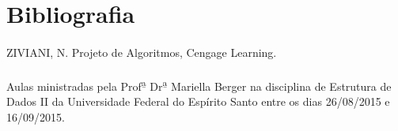 \documentclass[12pt,a4paper]{article}
\begin{document}
 \newpage
 \section{Bibliografia}
  {\paragraph{} ZIVIANI, N. Projeto de Algoritmos, Cengage Learning.}
  {\paragraph{} Aulas ministradas pela Prof\textsuperscript{\b a} Dr\textsuperscript{\b a} Mariella Berger na disciplina de Estrutura de Dados II da Universidade Federal do Espírito Santo entre os dias 26/08/2015 e 16/09/2015. }
 
\end{document}

